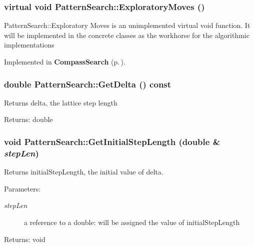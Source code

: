 \subsubsection{\setlength{\rightskip}{0pt plus 5cm}virtual void Pattern\-Search::Exploratory\-Moves ()\hspace{0.3cm}{\tt  [protected, pure virtual]}}\label{classPatternSearch_b1}


Pattern\-Search::Exploratory Moves is an unimplemented virtual void function. It will be implemented in the concrete classes as the workhorse for the algorithmic implementations 

Implemented in {\bf Compass\-Search} {\rm (p.\,\pageref{classCompassSearch_b0})}.
\subsubsection{\setlength{\rightskip}{0pt plus 5cm}double Pattern\-Search::Get\-Delta () const}\label{classPatternSearch_z21_1}


Returns delta, the lattice step length \begin{Desc}
\item[Returns:]double \end{Desc}
\subsubsection{\setlength{\rightskip}{0pt plus 5cm}void Pattern\-Search::Get\-Initial\-Step\-Length (double \& {\em step\-Len})}\label{classPatternSearch_z21_2}


Returns initial\-Step\-Length, the initial value of delta. \begin{Desc}
\item[Parameters:]
\begin{description}
\item[{\em step\-Len}]a reference to a double: will be assigned the value of initial\-Step\-Length \end{description}
\end{Desc}
\begin{Desc}
\item[Returns:]void \end{Desc}
